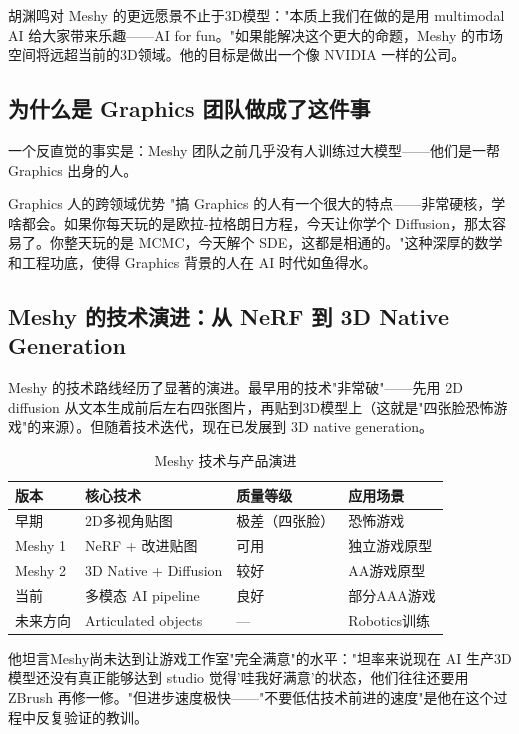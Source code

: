 \documentclass[a4paper]{article}
\begin{document}
胡渊鸣对 Meshy 的更远愿景不止于3D模型："本质上我们在做的是用 multimodal AI 给大家带来乐趣——AI for fun。"如果能解决这个更大的命题，Meshy 的市场空间将远超当前的3D领域。他的目标是做出一个像 NVIDIA 一样的公司。

\subsection{为什么是 Graphics 团队做成了这件事}

一个反直觉的事实是：Meshy 团队之前几乎没有人训练过大模型——他们是一帮 Graphics 出身的人。

\begin{knowledgebox}{Graphics 人的跨领域优势}
"搞 Graphics 的人有一个很大的特点——非常硬核，学啥都会。如果你每天玩的是欧拉-拉格朗日方程，今天让你学个 Diffusion，那太容易了。你整天玩的是 MCMC，今天解个 SDE，这都是相通的。"这种深厚的数学和工程功底，使得 Graphics 背景的人在 AI 时代如鱼得水。
\end{knowledgebox}

\subsection{Meshy 的技术演进：从 NeRF 到 3D Native Generation}

Meshy 的技术路线经历了显著的演进。最早用的技术"非常破"——先用 2D diffusion 从文本生成前后左右四张图片，再贴到3D模型上（这就是"四张脸恐怖游戏"的来源）。但随着技术迭代，现在已发展到 3D native generation。

\begin{table}[H]
\centering
\caption{Meshy 技术与产品演进}
\begin{tabular}{llll}
\toprule
\textbf{版本} & \textbf{核心技术} & \textbf{质量等级} & \textbf{应用场景} \\
\midrule
早期 & 2D多视角贴图 & 极差（四张脸） & 恐怖游戏 \\
Meshy 1 & NeRF + 改进贴图 & 可用 & 独立游戏原型 \\
Meshy 2 & 3D Native + Diffusion & 较好 & AA游戏原型 \\
当前 & 多模态 AI pipeline & 良好 & 部分AAA游戏 \\
未来方向 & Articulated objects & --- & Robotics训练 \\
\bottomrule
\end{tabular}
\end{table}

他坦言Meshy尚未达到让游戏工作室"完全满意"的水平："坦率来说现在 AI 生产3D模型还没有真正能够达到 studio 觉得'哇我好满意'的状态，他们往往还要用 ZBrush 再修一修。"但进步速度极快——"不要低估技术前进的速度"是他在这个过程中反复验证的教训。
\end{document}
